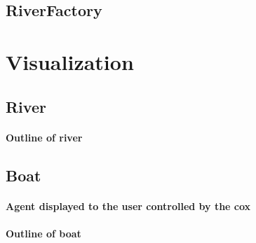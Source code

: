   \subsection{RiverFactory}

\section{Visualization}
  \subsection{River}
    \paragraph{Outline of river}
  
  \subsection{Boat}
    \paragraph{Agent displayed to the user controlled by the cox}
    \paragraph{Outline of boat}
